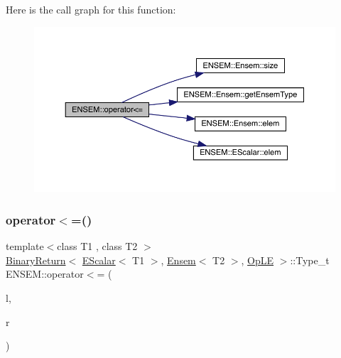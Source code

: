 Here is the call graph for this function\+:\nopagebreak
\begin{figure}[H]
\begin{center}
\leavevmode
\includegraphics[width=350pt]{d1/d9e/group__eensem_gaf74453e608d97ecc1e832a7b2a8fe3de_cgraph}
\end{center}
\end{figure}
\mbox{\label{group__eensem_ga876b949826dc1335f76b3b4e1c32b076}} 
\subsubsection{\texorpdfstring{operator$<$=()}{operator<=()}\hspace{0.1cm}{\footnotesize\ttfamily [3/3]}}
{\footnotesize\ttfamily template$<$class T1 , class T2 $>$ \\
\mbox{\hyperlink{structENSEM_1_1BinaryReturn}{Binary\+Return}}$<$ \mbox{\hyperlink{classENSEM_1_1EScalar}{E\+Scalar}}$<$ T1 $>$, \mbox{\hyperlink{classENSEM_1_1Ensem}{Ensem}}$<$ T2 $>$, \mbox{\hyperlink{structENSEM_1_1OpLE}{Op\+LE}} $>$\+::Type\+\_\+t E\+N\+S\+E\+M\+::operator$<$= (\begin{DoxyParamCaption}\item[{const \mbox{\hyperlink{classENSEM_1_1EScalar}{E\+Scalar}}$<$ T1 $>$ \&}]{l,  }\item[{const \mbox{\hyperlink{classENSEM_1_1Ensem}{Ensem}}$<$ T2 $>$ \&}]{r }\end{DoxyParamCaption})\hspace{0.3cm}{\ttfamily [inline]}}

